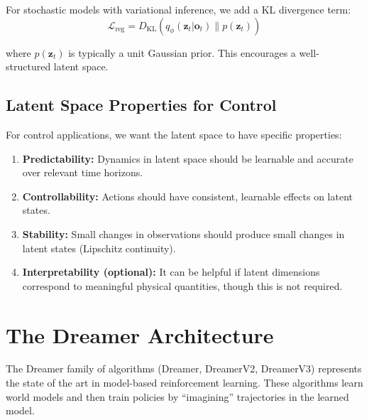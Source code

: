 For stochastic models with variational inference, we add a KL divergence term:
\begin{equation}
\mathcal{L}_{\text{reg}} = D_{\text{KL}}(q_\phi(\mathbf{z}_t | \mathbf{o}_t) \| p(\mathbf{z}_t))
\end{equation}

where $p(\mathbf{z}_t)$ is typically a unit Gaussian prior. This encourages a well-structured latent space.

\subsection{Latent Space Properties for Control}

For control applications, we want the latent space to have specific properties:

\begin{enumerate}
    \item \textbf{Predictability:} Dynamics in latent space should be learnable and accurate over relevant time horizons.

    \item \textbf{Controllability:} Actions should have consistent, learnable effects on latent states.

    \item \textbf{Stability:} Small changes in observations should produce small changes in latent states (Lipschitz continuity).

    \item \textbf{Interpretability (optional):} It can be helpful if latent dimensions correspond to meaningful physical quantities, though this is not required.
\end{enumerate}


\section{The Dreamer Architecture}
\label{sec:dreamer}

The Dreamer family of algorithms (Dreamer, DreamerV2, DreamerV3) represents the state of the art in model-based reinforcement learning. These algorithms learn world models and then train policies by ``imagining'' trajectories in the learned model.

